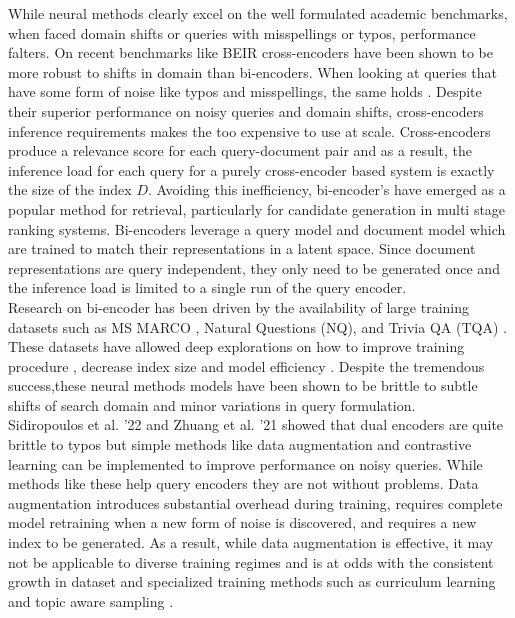 While neural methods clearly excel on the well formulated academic benchmarks, when faced domain shifts or queries with misspellings or typos, performance falters. On recent benchmarks like BEIR \cite{Thakur2021BEIRAH} cross-encoders have been shown to be more robust to shifts in domain than bi-encoders. When looking at queries that have some form of noise like typos and misspellings, the same holds \cite{zhuang-zuccon-2021-dealing}. Despite their superior performance on noisy queries and domain shifts, cross-encoders inference requirements makes the too expensive to use at scale. Cross-encoders produce a relevance score for each query-document pair and as a result, the inference load for each query for a purely cross-encoder based system is exactly the size of the index $D$. Avoiding this inefficiency, bi-encoder's have emerged as a popular method for retrieval, particularly for candidate generation in multi stage ranking systems. Bi-encoders leverage a query model and document model which are trained to match their representations in a latent space. Since document representations are query independent, they only need to be generated once and the inference load is limited to a single run of the query encoder. \\
Research on bi-encoder has been driven by the availability of large training datasets such as MS MARCO \cite{Campos2016MSMA}, Natural Questions (NQ)\cite{Kwiatkowski2019NaturalQA}, and Trivia QA (TQA) \cite{Joshi2017TriviaQAAL} . These datasets have allowed deep explorations on how to improve training procedure \cite{Qu2021RocketQAAO}, decrease index size \cite{Yamada2021EfficientPR} and model efficiency \cite{Khattab2020ColBERTEA}.  Despite the tremendous success,these neural methods models have been shown to be brittle to subtle shifts of search domain and minor variations in query formulation.  \\
Sidiropoulos et al. '22 \cite{Sidiropoulos2022AnalysingTR} and Zhuang et al. '21 \cite{zhuang-zuccon-2021-dealing} showed that dual encoders are quite brittle to typos but simple methods like data augmentation and contrastive learning can be implemented to improve performance on noisy queries. While methods like these help query encoders they are not without problems. Data augmentation introduces substantial overhead during training, requires complete model retraining when a new form of noise is discovered, and requires a new index to be generated. As a result, while data augmentation is effective, it may not be applicable to diverse training regimes and is at odds with the consistent growth in dataset and specialized training methods such as curriculum learning \cite{Mao2022CurriculumCC} and topic aware sampling \cite{Hofsttter2021EfficientlyTA}. \\
